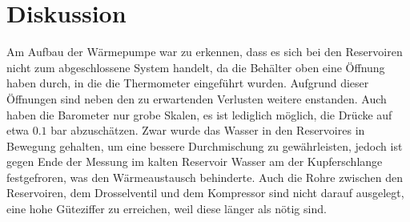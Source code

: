 \section{Diskussion}
\label{sec:Diskussion}

Am Aufbau der Wärmepumpe war zu erkennen, dass es sich bei den Reservoiren nicht zum abgeschlossene System handelt, da die Behälter oben eine Öffnung haben durch, in die die Thermometer eingeführt wurden.
Aufgrund dieser Öffnungen sind neben den zu erwartenden Verlusten weitere enstanden. Auch haben die Barometer nur grobe Skalen, es ist lediglich möglich, die Drücke auf etwa {$0.1$} bar abzuschätzen.
Zwar wurde das Wasser in den Reservoires in Bewegung gehalten, um eine bessere Durchmischung zu gewährleisten, jedoch ist gegen Ende der Messung im kalten Reservoir Wasser am der Kupferschlange  festgefroren, was den Wärmeaustausch behinderte.
Auch die Rohre zwischen den Reservoiren, dem Drosselventil und dem Kompressor sind nicht darauf ausgelegt, eine hohe Güteziffer zu erreichen, weil diese länger als nötig sind.